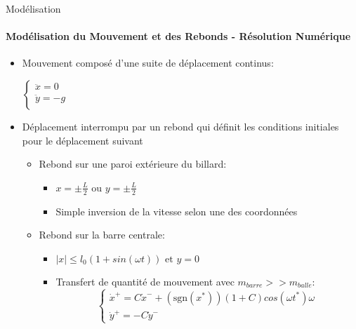 \documentclass{beamer}
\begin{document}
  \begin{frame}{Modélisation}
  \framesubtitle{Modélisation du Mouvement et des Rebonds - Résolution Numérique}
  \begin{itemize}
    \item Mouvement composé d'une suite de déplacement continus:\\
    \pause \begin{center}
      \(\begin{cases}
        {\textstyle \ddot{x}=0}\\
        {\textstyle \ddot{y}=-g}\\
      \end{cases}\)
    \end{center}
    \pause \item Déplacement interrompu par un rebond qui définit les conditions initiales pour le déplacement suivant
    \begin{itemize}
      \pause \item Rebond sur une paroi extérieure du billard:
      \begin{itemize}
        \item \(x=\pm \frac{L}{2} \text{ ou } y=\pm \frac{L}{2}\)
        \item Simple inversion de la vitesse selon une des coordonnées 
      \end{itemize}
      \pause \item Rebond sur la barre centrale:
      \begin{itemize}
        \item \(\lvert x \rvert \leq l_0(1+sin(\omega t)) \text{ et } y=0\)
        \item Transfert de quantité de mouvement avec \({\scriptstyle m_{barre}>>m_{balle}}\):
        \[\begin{cases}
          \dot{x}^+=C\dot{x}^- +  (\text{sgn}(x^*))(1+C)cos(\omega t^*)\omega\\
          \dot{y}^+=-C \dot{y}^-
        \end{cases}\]
      \end{itemize}
    \end{itemize}
  \end{itemize}
  \end{frame}
\end{document}
